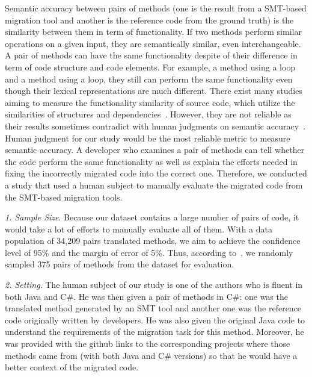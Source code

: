 %
Semantic accuracy between pairs of methods (one is the result from a
SMT-based migration tool and another is the reference code from the
ground truth) is the similarity between them in term of
functionality. If two methods perform similar operations on a given
input, they are semantically similar, even interchangeable. A pair of
methods can have the same functionality despite of their difference in
term of code structure and code elements.
%
For example, a method using a  loop and a method using a
 loop, they still can perform the same functionality even
though their lexical representations are much different. There exist
many studies aiming to measure the functionality similarity of source
code, which utilize the similarities of structures and
dependencies~\cite{clone-tse07,roy09,baker97,ccfinder,cpminer,deckard,deckard2,horwitz01}.
However, they are not reliable as their results sometimes contradict
with human judgments on semantic accuracy~\cite{deckard2}. 
%
Human judgment for our study would be the most reliable metric to
measure semantic accuracy. A developer who examines a pair of methods
can tell whether the code perform the same functionality as well as
explain the efforts needed in fixing the incorrectly migrated code
into the correct one. Therefore, we conducted a study that used a
human subject to manually evaluate the migrated code from the
SMT-based migration tools.


\emph{1. Sample Size}. Because our dataset contains a large number of
pairs of code, it would take a lot of efforts to manually evaluate all
of them. With a data population of 34,209 pairs translated methods, we
aim to achieve the confidence level of 95\% and the margin of error of
5\%. Thus, according to~\cite{website}, we randomly sampled 375
pairs of methods from the dataset for evaluation.


\emph{2. Setting}. The human subject of our study is one of the
authors who is fluent in both Java and C\#. He was then given a pair
of methods in C\#: one was the translated method generated by an SMT
tool and another one was the reference code originally written by
developers.
He was also given the original Java code to understand the
requirements of the migration task for this method. Moreover, he was
provided with the github links to the corresponding projects where
those methods came from (with both Java and C\# versions) so that he
would have a better context of the migrated code.

